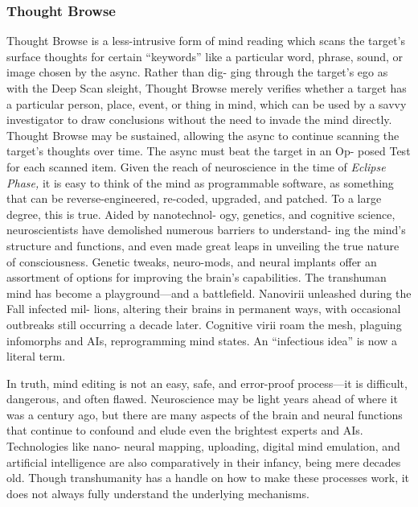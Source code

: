 \subsubsection{Thought Browse}

Thought Browse is a less-intrusive form of mind 
reading which scans the target's surface thoughts for 
certain ``keywords'' like a particular word, phrase, 
sound, or image chosen by the async. Rather than dig-
ging through the target's ego as with the Deep Scan 
sleight, Thought Browse merely verifies whether a 
target has a particular person, place, event, or thing 
in mind, which can be used by a savvy investigator to 
draw conclusions without the need to invade the mind 
directly. Thought Browse may be sustained, allowing 
the async to continue scanning the target's thoughts 
over time. The async must beat the target in an Op-
posed Test for each scanned item.
Given the reach of neuroscience in the time of 
\textit{Eclipse Phase,} it is easy to think of the mind as 
programmable software, as something that can be 
reverse-engineered, re-coded, upgraded, and patched. 
To a large degree, this is true. Aided by nanotechnol-
ogy, genetics, and cognitive science, neuroscientists 
have demolished numerous barriers to understand-
ing the mind's structure and functions, and even 
made great leaps in unveiling the true nature of 
consciousness. Genetic tweaks, neuro-mods, and 
neural implants offer an assortment of options for 
improving the brain's capabilities. The transhuman 
mind has become a playground—and a battlefield. 
Nanovirii unleashed during the Fall infected mil-
lions, altering their brains in permanent ways, with 
occasional outbreaks still occurring a decade later. 
Cognitive virii roam the mesh, plaguing infomorphs 
and AIs, reprogramming mind states. An ``infectious 
idea'' is now a literal term.

In truth, mind editing is not an easy, safe, and 
error-proof process—it is difficult, dangerous, and 
often flawed. Neuroscience may be light years 
ahead of where it was a century ago, but there are 
many aspects of the brain and neural functions 
that continue to confound and elude even the 
brightest experts and AIs. Technologies like nano-
neural mapping, uploading, digital mind emulation, 
and artificial intelligence are also comparatively 
in their infancy, being mere decades old. Though 
transhumanity has a handle on how to make these 
processes work, it does not always fully understand 
the underlying mechanisms.

